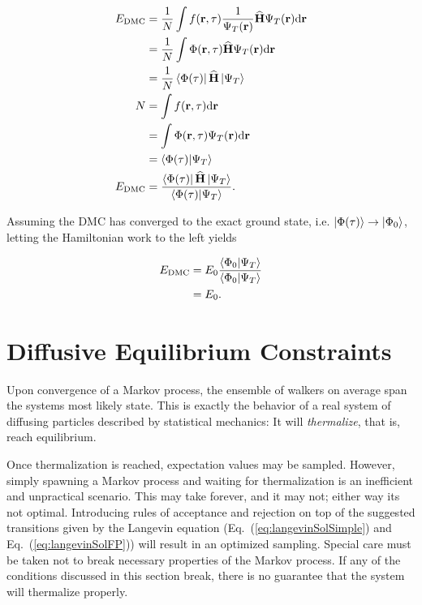 \begin{align*}
 E_\mathrm{DMC} &= \frac{1}{N}\int f(\mathbf{r}, \tau) \frac{1}{\Psi_T(\mathbf{r})} {\bf\widehat{H}} \Psi_T(\mathbf{r}) \mathrm{d}\mathbf{r} \\
                &= \frac{1}{N}\int \Phi(\mathbf{r}, \tau) {\bf\widehat{H}} \Psi_T(\mathbf{r}) \mathrm{d}\mathbf{r} \\
                &= \frac{1}{N}\left< \Phi(\tau) \right|{\bf\widehat{H}}\left| \Psi_T \right> \\
               N&= \int f(\mathbf{r}, \tau) \mathrm{d}\mathbf{r} \\
                &= \int \Phi(\mathbf{r}, \tau)\Psi_T(\mathbf{r})\mathrm{d}\mathbf{r} \\
                &= \left\langle \Phi(\tau) | \Psi_T\right\rangle\\
 E_\mathrm{DMC} &= \frac{\left< \Phi(\tau) \right|{\bf\widehat{H}}\left| \Psi_T \right>}{\left\langle \Phi(\tau) | \Psi_T\right\rangle}.\\
\end{align*}

Assuming the DMC has converged to the exact ground state, i.e. $\left| \Phi(\tau) \right>\to\left| \Phi_0 \right>$, letting the Hamiltonian work to the left yields

\begin{align*}
 E_\mathrm{DMC} &= E_0\frac{\left\langle \Phi_0 | \Psi_T\right\rangle}{\left\langle \Phi_0 | \Psi_T\right\rangle} \\
                &= E_0.
\end{align*}

\section{Diffusive Equilibrium Constraints}

Upon convergence of a Markov process, the ensemble of walkers on average span the systems most likely state. This is exactly the behavior of a real system of diffusing particles described by statistical mechanics: It will \textit{thermalize}, that is, reach equilibrium. 

Once thermalization is reached, expectation values may be sampled. However, simply spawning a Markov process and waiting for thermalization is an inefficient and unpractical scenario. This may take forever, and it may not; either way its not optimal. Introducing rules of acceptance and rejection on top of the suggested transitions given by the Langevin equation (Eq.~(\ref{eq:langevinSolSimple}) and Eq.~(\ref{eq:langevinSolFP})) will result in an optimized sampling. Special care must be taken not to break necessary properties of the Markov process. If any of the conditions discussed in this section break, there is no guarantee that the system will thermalize properly.

